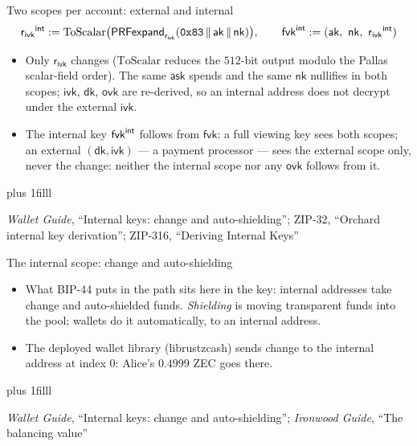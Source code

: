 \documentclass[aspectratio=169,11pt]{beamer}
\newcommand{\aksym}{\ensuremath{\mathsf{ak}}}
\newcommand{\nksym}{\ensuremath{\mathsf{nk}}}
\newcommand{\asksym}{\ensuremath{\mathsf{ask}}}
\newcommand{\ivk}{\ensuremath{\mathsf{ivk}}}
\newcommand{\fvk}{\ensuremath{\mathsf{fvk}}}
\newcommand{\ovk}{\ensuremath{\mathsf{ovk}}}
\newcommand{\dk}{\ensuremath{\mathsf{dk}}}
\newcommand{\rivk}{\ensuremath{\mathsf{r_{ivk}}}}
\newcommand{\src}[1]{\par\vskip0pt plus 1filll
  {\fontsize{6}{7.2}\selectfont\color{arbdim}\raggedright #1\par}}
\begin{document}
\begin{frame}{Two scopes per account: external and internal}
\[
\Dint{\rivk} := \mathrm{ToScalar}\bigl(\Dprf{\rivk}(\mathtt{0x83}\,\|\,
\aksym\,\|\,\nksym)\bigr), \qquad
\Dint{\fvk} := (\aksym,\ \nksym,\ \Dint{\rivk})
\]
\begin{itemize}
  \item Only \rivk{} changes ($\mathrm{ToScalar}$ reduces the $512$-bit
    output modulo the Pallas scalar-field order). The same \asksym{} spends
    and the same \nksym{} nullifies in both scopes; \ivk, \dk, \ovk{} are
    re-derived, so an internal address does not decrypt under the external
    \ivk.
  \item The internal key $\Dint{\fvk}$ follows from \fvk: a full viewing
    key sees both scopes; an external $(\dk, \ivk)$ --- a payment
    processor --- sees the external scope only, never the change: neither
    the internal scope nor any \ovk{} follows from it.
\end{itemize}
\src{\emph{Wallet Guide}, ``Internal keys: change and auto-shielding'';
ZIP-32, ``Orchard internal key derivation''; ZIP-316, ``Deriving Internal
Keys''}
\end{frame}

\begin{frame}{The internal scope: change and auto-shielding}
\begin{itemize}
  \item What BIP-44 puts in the path sits here in the key: internal
    addresses take change and auto-shielded funds. \emph{Shielding} is
    moving transparent funds into the pool; wallets do it automatically,
    to an internal address.
  \item The deployed wallet library (librustzcash) sends change to the
    internal address at index $0$: Alice's $0.4999$ ZEC goes there.
\end{itemize}
\src{\emph{Wallet Guide}, ``Internal keys: change and auto-shielding'';
\emph{Ironwood Guide}, ``The balancing value''}
\end{frame}
\end{document}
